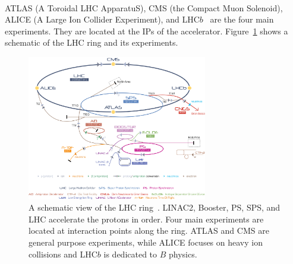 \paragraph{}
ATLAS (A Toroidal LHC ApparatuS), CMS (the Compact Muon Solenoid), ALICE (A Large Ion Collider Experiment), and LHC$b$~\cite{ATLASPaper, CMSPaper, LHCbPaper, ALICEPaper} are the four main experiments. They are located at the IPs of the accelerator. Figure~\ref{fig:LHC} shows a schematic of the LHC ring and its experiments.

\begin{figure}[h!]
  \centering
  \captionsetup{justification=centering}
  \includegraphics[width=0.7\textwidth]{figures/detector/Cern-Accelerator-Complex.jpg}
   \caption{A schematic view of the LHC ring~\cite{LHCReview}. LINAC2, Booster, PS, SPS, and LHC accelerate the protons in order. Four main experiments are located at interaction points along the ring. ATLAS and CMS are general purpose experiments, while ALICE focuses on heavy ion collisions and LHC$b$ is dedicated to $B$ physics.}
  \label{fig:LHC}
\end{figure}

